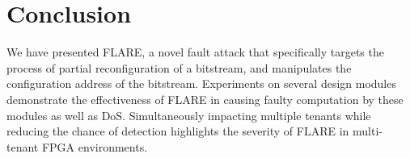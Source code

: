 \section{Conclusion}
\vspace{-0.1cm}
We have presented FLARE, a novel fault attack that specifically targets the process of partial reconfiguration of a bitstream, and manipulates the configuration address of the bitstream. Experiments on several design modules demonstrate the effectiveness of FLARE in causing faulty computation by these modules as well as DoS.  Simultaneously impacting multiple tenants while reducing the chance of detection highlights the severity of FLARE in multi-tenant FPGA environments.
